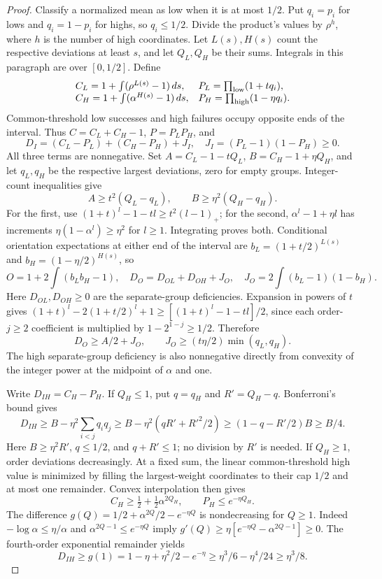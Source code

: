\begin{proof}
Classify a normalized mean as low when it is at most $1/2$. Put $q_i=p_i$
for lows and $q_i=1-p_i$ for highs, so $q_i\le1/2$. Divide the product's
values by $\rho^h$, where $h$ is the number of high coordinates.
Let $L(s),H(s)$ count the respective deviations at least $s$, and let
$Q_L,Q_H$ be their sums. Integrals in this paragraph are over $[0,1/2]$.
Define
\[
 \begin{array}{ll}
 C_L=1+\int(\rho^{L(s)}-1)\,ds,&P_L=\prod_{\rm low}(1+tq_i),\\
 C_H=1+\int(\alpha^{H(s)}-1)\,ds,&P_H=\prod_{\rm high}(1-\eta q_i).
 \end{array}
\]
Common-threshold low successes and high failures occupy opposite ends
of the interval. Thus $C=C_L+C_H-1$, $P=P_LP_H$, and
\begin{equation}\label{eq:coarse-components}
 D_I=(C_L-P_L)+(C_H-P_H)+J_I,
 \quad J_I=(P_L-1)(1-P_H)\ge0.
\end{equation}
All three terms are nonnegative. Set
$A=C_L-1-tQ_L$, $B=C_H-1+\eta Q_H$, and let $q_L,q_H$ be the respective
largest deviations, zero for empty groups. Integer-count inequalities give
\begin{equation}\label{eq:dispersion-coarse}
 A\ge t^2(Q_L-q_L),\qquad B\ge\eta^2(Q_H-q_H).
\end{equation}
For the first, use $(1+t)^l-1-tl\ge t^2(l-1)_+$; for the second,
$\alpha^l-1+\eta l$ has increments $\eta(1-\alpha^l)\ge\eta^2$
for $l\ge1$. Integrating proves both.
Conditional orientation expectations at either end of the interval are
$b_L=(1+t/2)^{L(s)}$ and $b_H=(1-\eta/2)^{H(s)}$, so
\[
 O=1+2\int(b_Lb_H-1),\quad
 D_O=D_{OL}+D_{OH}+J_O,\quad J_O=2\int(b_L-1)(1-b_H).
\]
Here $D_{OL},D_{OH}\ge0$ are the separate-group deficiencies.
Expansion in powers of $t$ gives
$(1+t)^l-2(1+t/2)^l+1\ge[(1+t)^l-1-tl]/2$, since each order-$j\ge2$
coefficient is multiplied by $1-2^{1-j}\ge1/2$. Therefore
\begin{equation}\label{eq:orientation-coarse}
 D_O\ge A/2+J_O,\qquad J_O\ge(t\eta/2)\min(q_L,q_H).
\end{equation}
The high separate-group deficiency is also nonnegative directly from
convexity of the integer power at the midpoint of $\alpha$ and one.

Write $D_{IH}=C_H-P_H$. If $Q_H\le1$, put $q=q_H$ and $R'=Q_H-q$.
Bonferroni's bound gives
\[
 D_{IH}\ge B-\eta^2\sum_{i<j}q_iq_j
 \ge B-\eta^2(qR'+R'^2/2)
 \ge(1-q-R'/2)B\ge B/4.
\]
Here $B\ge\eta^2R'$, $q\le1/2$, and $q+R'\le1$; no division by
$R'$ is needed. If $Q_H\ge1$, order deviations decreasingly.
At a fixed sum, the linear common-threshold high value is minimized
by filling the largest-weight coordinates to their cap $1/2$ and at
most one remainder. Convex interpolation then gives
\[
 C_H\ge\tfrac12+\tfrac12\alpha^{2Q_H},\qquad P_H\le e^{-\eta Q_H}.
\]
The difference $g(Q)=1/2+\alpha^{2Q}/2-e^{-\eta Q}$ is nondecreasing
for $Q\ge1$. Indeed $-\log\alpha\le\eta/\alpha$ and
$\alpha^{2Q-1}\le e^{-\eta Q}$ imply
$g'(Q)\ge\eta[e^{-\eta Q}-\alpha^{2Q-1}]\ge0$.
The fourth-order exponential remainder yields
\[
 D_{IH}\ge g(1)=1-\eta+\eta^2/2-e^{-\eta}
 \ge\eta^3/6-\eta^4/24\ge\eta^3/8.
\]


\end{proof}
